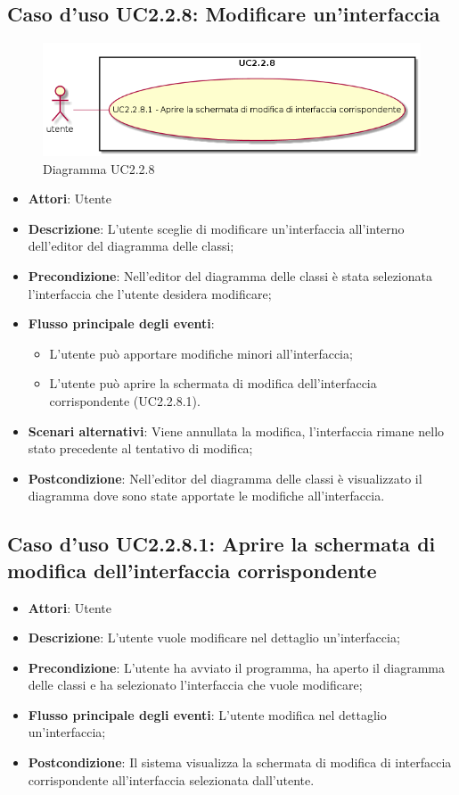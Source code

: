 \documentclass[../AnalisiDeiRequisiti.tex]{subfiles}
\begin{document}
			\subsection{Caso d'uso UC2.2.8: Modificare un'interfaccia}
			\begin{figure} [H]
				\centering
				\includegraphics[scale=0.45]{./Figures/UC2.2.8.png}
				\caption{Diagramma UC2.2.8}\label{}
			\end{figure}
			\begin{itemize}
				\item \textbf{Attori}: Utente
				\item \textbf{Descrizione}: L'utente sceglie di modificare un'interfaccia all'interno dell'editor del diagramma delle classi;
				\item \textbf{Precondizione}: Nell'editor del diagramma delle classi è stata selezionata l'interfaccia che l'utente desidera modificare;
				\item \textbf{Flusso principale degli eventi}: \begin{itemize}
					\item L'utente può apportare modifiche minori all'interfaccia;
					\item L'utente può aprire la schermata di modifica dell'interfaccia corrispondente (UC2.2.8.1).
				\end{itemize}
				\item \textbf{Scenari alternativi}: Viene annullata la modifica, l'interfaccia rimane nello stato precedente al tentativo di modifica;
				\item \textbf{Postcondizione}: Nell'editor del diagramma delle classi è visualizzato il diagramma dove sono state apportate le modifiche all'interfaccia.
			\end{itemize}
			\subsection{Caso d'uso UC2.2.8.1: Aprire la schermata di modifica dell'interfaccia corrispondente}
			\begin{itemize}
				\item \textbf{Attori}: Utente
				\item \textbf{Descrizione}: L'utente vuole modificare nel dettaglio un'interfaccia;
				\item \textbf{Precondizione}: L'utente ha avviato il programma, ha aperto il diagramma delle classi e ha selezionato l'interfaccia che vuole modificare;
				\item \textbf{Flusso principale degli eventi}: L'utente modifica nel dettaglio un'interfaccia;
				\item \textbf{Postcondizione}: Il sistema visualizza la schermata di modifica di interfaccia corrispondente all'interfaccia selezionata dall'utente.
			\end{itemize}
\end{document}
